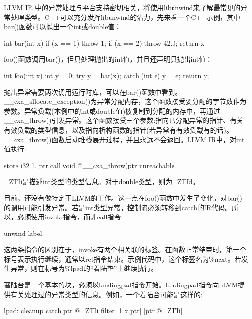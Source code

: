 LLVM IR 中的异常处理与平台支持密切相关，将使用libunwind来了解最常见的异常处理类型。C++可以充分发挥libunwind的潜力，先来看一个C++示例，其中bar()函数可以抛出一个int或double值：

\begin{cpp}
int bar(int x) {
    if (x == 1) throw 1;
    if (x == 2) throw 42.0;
    return x;
}
\end{cpp}

foo()函数调用bar()，但只处理抛出的int值，并且还声明只抛出int值：

\begin{cpp}
int foo(int x) {
    int y = 0;
    try {
        y = bar(x);
    }
    catch (int e) {
        y = e;
    }
    return y;
}
\end{cpp}

抛出异常需要两次调用运行时库，可以在bar()函数中看到。\_\_cxa\_allocate\_exception()为异常分配内存，这个函数接受要分配的字节数作为参数。异常负载(本例中的int或double值)被复制到分配的内存中，再通过\_\_cxa\_throw()引发异常。这个函数接受三个参数:指向已分配异常的指针、有关有效负载的类型信息，以及指向析构函数的指针(若异常有有效负载有的话)。\_\_cxa\_throw()函数启动堆栈展开过程，并且永远不会返回。LLVM IR中，对int值执行:

\begin{shell}
store i32 1, ptr %
call void @__cxa_throw(ptr %
unreachable
\end{shell}

\_ZTIi是描述int类型的类型信息。对于double类型，则为\_ZTId。

目前，还没有做特定于LLVM的工作。这一点在foo()函数中发生了变化，对bar()的调用可能引发异常。若是int类型异常，控制流必须转移到catch的IR代码。所以，必须使用invoke指令，而非call指令:

\begin{shell}
                                 unwind label %
\end{shell}

这两条指令的区别在于，invoke有两个相关联的标签。在函数正常结束时，第一个标号表示执行继续，通常以ret指令结束。示例代码中，这个标签名为\%next。若发生异常，则在标号为\%lpad的“着陆垫”上继续执行。

著陆台是一个基本的块，必须以landingpad指令开始。landingpad指令向LLVM提供有关处理过的异常类型的信息。例如，一个着陆台可能是这样的:

\begin{shell}
lpad:
            cleanup
            catch ptr @_ZTIi
            filter [1 x ptr] [ptr @_ZTIi]
\end{shell}

